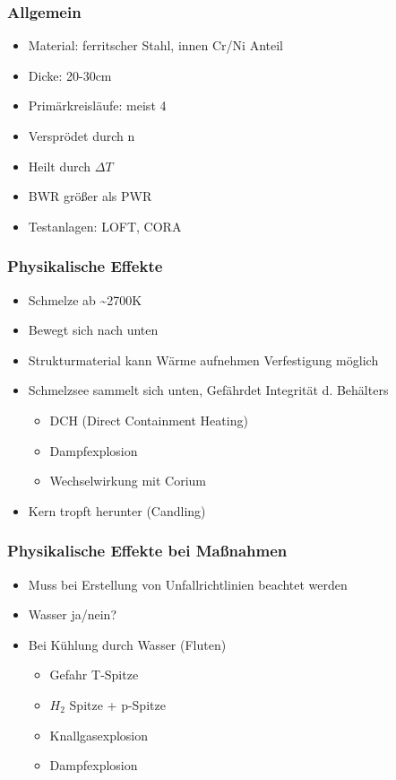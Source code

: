 \documentclass[12pt]{article}
\begin{document}
\subsubsection{Allgemein}
\begin{itemize}
	\item Material: ferritscher Stahl, innen Cr/Ni Anteil
	\item Dicke: 20-30cm
	\item Primärkreisläufe: meist 4
	\item Versprödet durch n
	\item Heilt durch \(\Delta T\)
	\item BWR größer als PWR
	\item Testanlagen: LOFT, CORA
\end{itemize}

\subsubsection{Physikalische Effekte}
\begin{itemize}
	\item Schmelze ab \textasciitilde 2700K
	\item Bewegt sich nach unten
	\item Strukturmaterial kann Wärme aufnehmen \textrightarrow Verfestigung möglich
	\item Schmelzsee sammelt sich unten, Gefährdet Integrität d. Behälters
		\begin{itemize}
			\item DCH (Direct Containment Heating)
			\item Dampfexplosion
			\item Wechselwirkung mit Corium
		\end{itemize}
	\item Kern tropft herunter (Candling)
\end{itemize}

\subsubsection{Physikalische Effekte bei Maßnahmen}
\begin{itemize}
	\item Muss bei Erstellung von Unfallrichtlinien beachtet werden
	\item Wasser ja/nein?
	\item Bei Kühlung durch Wasser (Fluten)
		\begin{itemize}
			\item Gefahr T-Spitze
			\item \(H_2\) Spitze + p-Spitze
			\item Knallgasexplosion
			\item Dampfexplosion
		\end{itemize}
\end{itemize}
\end{document}
